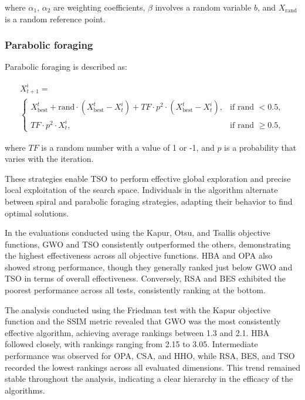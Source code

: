 \documentclass{elsarticle}
\begin{document}
\noindent 
where $\alpha_1$, $\alpha_2$ are weighting coefficients, $\beta$ involves a random variable $b$, and $X_{\text{rand}}$ is a random reference point.

\subsubsection{Parabolic foraging}

Parabolic foraging is described as:

\begin{equation}
    \begin{gathered}
        X_{t+1}^i = \\
        \begin{cases}
            X_{\text{best}}^t + \text{rand} \cdot (X_{\text{best}}^t - X_t^i) + TF \cdot p^2 \cdot (X_{\text{best}}^t - X_t^i), & \text{if rand } < 0.5,\\
            TF \cdot p^2 \cdot X_t^i, & \text{if rand } \geq 0.5,
        \end{cases}
    \end{gathered}
\end{equation}

\noindent 
where $TF$ is a random number with a value of 1 or -1, and $p$ is a probability that varies with the iteration.

These strategies enable TSO to perform effective global exploration and precise local exploitation of the search space. Individuals in the algorithm alternate between spiral and parabolic foraging strategies, adapting their behavior to find optimal solutions.

In the evaluations conducted using the Kapur, Otsu, and Tsallis objective functions, GWO and TSO consistently outperformed the others, demonstrating the highest effectiveness across all objective functions. HBA and OPA also showed strong performance, though they generally ranked just below GWO and TSO in terms of overall effectiveness. Conversely, RSA and BES exhibited the poorest performance across all tests, consistently ranking at the bottom.

The analysis conducted using the Friedman test with the Kapur objective function and the SSIM metric revealed that GWO was the most consistently effective algorithm, achieving average rankings between 1.3 and 2.1. HBA followed closely, with rankings ranging from 2.15 to 3.05. Intermediate performance was observed for OPA, CSA, and HHO, while RSA, BES, and TSO recorded the lowest rankings across all evaluated dimensions. This trend remained stable throughout the analysis, indicating a clear hierarchy in the efficacy of the algorithms.
\end{document}
